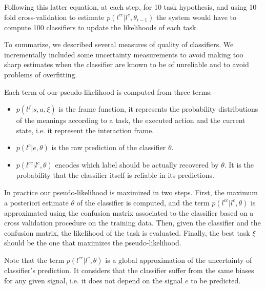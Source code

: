Following this latter equation, at each step, for 10 task hypothesis, and using 10 fold cross-validation to estimate $p(l^{cc} | l^c, \theta_{i-1})$ the system would have to compute 100 classifiers to update the likelihoods of each task.

\transition

To summarize, we described several measures of quality of classifiers. We incrementally included some uncertainty measurements to avoid making too sharp estimates when the classifier are known to be of unreliable and to avoid problems of overfitting.


Each term of our pseudo-likelihood is computed from three terms: 
\begin{itemize}
\item $p(l^f|s,a,\xi)$ is the frame function, it represents the probability distributions of the meanings according to a task, the executed action and the current state, i.e. it represent the interaction frame. 
\item $p(l^c | e, \theta)$ is the raw prediction of the classifier $\theta$. 
\item $p(l^{cc} | l^c, \theta)$ encodes which label should be actually recovered by $\theta$. It is the probability that the classifier itself is reliable in its predictions. 
\end{itemize}

In practice our pseudo-likelihood is maximized in two steps. First, the maximum a posteriori estimate $\theta$ of the classifier is computed, and the term $p(l^{cc} | l^c, \theta)$ is approximated using the confusion matrix associated to the classifier based on a cross validation procedure on the training data. Then, given the classifier and the confusion matrix, the likelihood of the task is evaluated. Finally, the best task $\xi$ should be the one that maximizes the pseudo-likelihood.


Note that the term $p(l^{cc} | l^c, \theta)$ is a global approximation of the uncertainty of classifier's prediction. It considers that the classifier suffer from the same biases for any given signal, i.e. it does not depend on the signal $e$ to be predicted.


